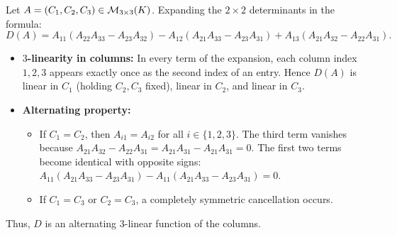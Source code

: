 \begin{exercisesolution}
\label{sol:laplace_expansion_3x3_alternating_trilinear}
Let $A = (C_1, C_2, C_3) \in \mathcal{M}_{3 \times 3}(K)$. Expanding the $2 \times 2$ determinants in the formula:
\[
D(A) = A_{11}(A_{22}A_{33} - A_{23}A_{32}) - A_{12}(A_{21}A_{33} - A_{23}A_{31}) + A_{13}(A_{21}A_{32} - A_{22}A_{31}).
\]
\begin{itemize}
    \item \textbf{$3$-linearity in columns:}
    In every term of the expansion, each column index $1, 2, 3$ appears exactly once as the second index of an entry.
    Hence $D(A)$ is linear in $C_1$ (holding $C_2, C_3$ fixed), linear in $C_2$, and linear in $C_3$.
    \item \textbf{Alternating property:}
    \begin{itemize}
        \item If $C_1 = C_2$, then $A_{i1} = A_{i2}$ for all $i \in \{1, 2, 3\}$.
        The third term vanishes because $A_{21}A_{32} - A_{22}A_{31} = A_{21}A_{31} - A_{21}A_{31} = 0$.
        The first two terms become identical with opposite signs:
        $A_{11}(A_{21}A_{33} - A_{23}A_{31}) - A_{11}(A_{21}A_{33} - A_{23}A_{31}) = 0$.
        \item If $C_1 = C_3$ or $C_2 = C_3$, a completely symmetric cancellation occurs.
    \end{itemize}
\end{itemize}
Thus, $D$ is an alternating $3$-linear function of the columns.
\end{exercisesolution}


